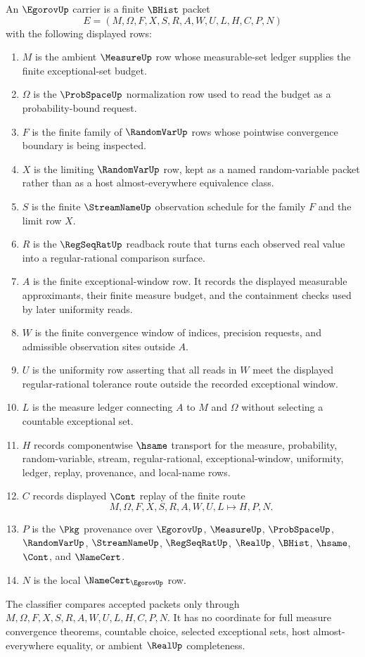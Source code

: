 \begin{definition}\label{def:egorov-carrier}
An $\EgorovUp$ carrier is a finite $\BHist$ packet
$$
E=(M,\Omega,F,X,S,R,A,W,U,L,H,C,P,N)
$$
with the following displayed rows:
\begin{enumerate}
\item $M$ is the ambient $\MeasureUp$ row whose measurable-set ledger supplies the finite exceptional-set budget.
\item $\Omega$ is the $\ProbSpaceUp$ normalization row used to read the budget as a probability-bound request.
\item $F$ is the finite family of $\RandomVarUp$ rows whose pointwise convergence boundary is being inspected.
\item $X$ is the limiting $\RandomVarUp$ row, kept as a named random-variable packet rather than as a host almost-everywhere equivalence class.
\item $S$ is the finite $\StreamNameUp$ observation schedule for the family $F$ and the limit row $X$.
\item $R$ is the $\RegSeqRatUp$ readback route that turns each observed real value into a regular-rational comparison surface.
\item $A$ is the finite exceptional-window row. It records the displayed measurable approximants, their finite measure budget, and the containment checks used by later uniformity reads.
\item $W$ is the finite convergence window of indices, precision requests, and admissible observation sites outside $A$.
\item $U$ is the uniformity row asserting that all reads in $W$ meet the displayed regular-rational tolerance route outside the recorded exceptional window.
\item $L$ is the measure ledger connecting $A$ to $M$ and $\Omega$ without selecting a countable exceptional set.
\item $H$ records componentwise $\hsame$ transport for the measure, probability, random-variable, stream, regular-rational, exceptional-window, uniformity, ledger, replay, provenance, and local-name rows.
\item $C$ records displayed $\Cont$ replay of the finite route
$$
M,\Omega,F,X,S,R,A,W,U,L \longmapsto H,P,N .
$$
\item $P$ is the $\Pkg$ provenance over $\EgorovUp$, $\MeasureUp$, $\ProbSpaceUp$, $\RandomVarUp$, $\StreamNameUp$, $\RegSeqRatUp$, $\RealUp$, $\BHist$, $\hsame$, $\Cont$, and $\NameCert$.
\item $N$ is the local $\NameCert_{\EgorovUp}$ row.
\end{enumerate}
The classifier compares accepted packets only through $M,\Omega,F,X,S,R,A,W,U,L,H,C,P,N$. It has no coordinate for full measure convergence theorems, countable choice, selected exceptional sets, host almost-everywhere equality, or ambient $\RealUp$ completeness.
\end{definition}


